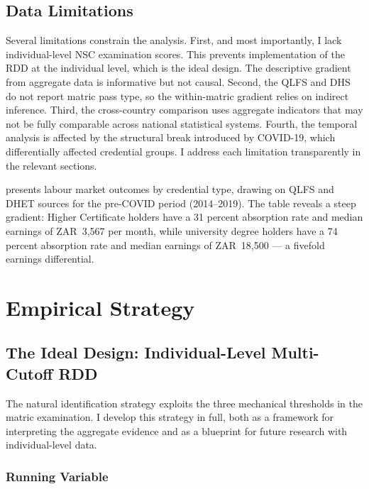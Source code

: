 \documentclass[12pt]{article}
\begin{document}
\subsection{Data Limitations}

Several limitations constrain the analysis. First, and most importantly, I lack individual-level NSC examination scores. This prevents implementation of the RDD at the individual level, which is the ideal design. The descriptive gradient from aggregate data is informative but not causal. Second, the QLFS and DHS do not report matric pass type, so the within-matric gradient relies on indirect inference. Third, the cross-country comparison uses aggregate indicators that may not be fully comparable across national statistical systems. Fourth, the temporal analysis is affected by the structural break introduced by COVID-19, which differentially affected credential groups. I address each limitation transparently in the relevant sections.



 presents labour market outcomes by credential type, drawing on QLFS and DHET sources for the pre-COVID period (2014--2019). The table reveals a steep gradient: Higher Certificate holders have a 31 percent absorption rate and median earnings of ZAR~3{,}567 per month, while university degree holders have a 74 percent absorption rate and median earnings of ZAR~18{,}500 --- a fivefold earnings differential.


\section{Empirical Strategy}
\label{sec:strategy}

\subsection{The Ideal Design: Individual-Level Multi-Cutoff RDD}

The natural identification strategy exploits the three mechanical thresholds in the matric examination. I develop this strategy in full, both as a framework for interpreting the aggregate evidence and as a blueprint for future research with individual-level data.

\subsubsection{Running Variable}
\end{document}
